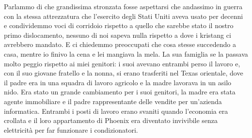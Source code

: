 Parlammo di che grandissima stronzata fosse aspettarsi che andassimo in
guerra con la stessa attrezzatura che l'esercito degli Stati Uniti aveva
usato per decenni e condividemmo voci di corridoio rispetto a quello che
sarebbe stato il nostro primo dislocamento, nessuno di noi sapeva nulla
rispetto a dove i kristang ci avrebbero mandato. E ci chiedemmo
preoccupati che cosa stesse succedendo a casa, mentre io finivo la cena
e lei mangiava la mela. La sua famiglia se la passava molto peggio
rispetto ai miei genitori: i suoi avevano entrambi perso il lavoro e,
con il suo giovane fratello e la nonna, si erano trasferiti nel Texas
orientale, dove il padre era in una squadra di lavoro agricolo e la
madre lavorava in un asilo nido. Era stato un grande cambiamento per i
suoi genitori, la madre era stata agente immobiliare e il padre
rappresentante delle vendite per un'azienda informatica. Entrambi i
posti di lavoro erano svaniti quando l'economia era crollata e il loro
appartamento di Phoenix era diventato invivibile senza elettricità per
far funzionare i condizionatori.

